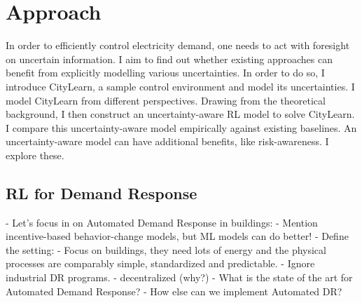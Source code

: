 \chapter{Approach}
    \label{approach}
    





In order to efficiently control electricity demand, one needs to act with foresight on uncertain information.
I aim to find out whether existing approaches can benefit from explicitly modelling various uncertainties.
In order to do so, I introduce CityLearn, a sample control environment and model its uncertainties. I model CityLearn from different perspectives.
Drawing from the theoretical background, I then construct an uncertainty-aware RL model to solve CityLearn.
I compare this uncertainty-aware model empirically against existing baselines.
An uncertainty-aware model can have additional benefits, like risk-awareness. I explore these. 


\section{RL for Demand Response}
- Let's focus in on Automated Demand Response in buildings:
    - Mention incentive-based behavior-change models, but ML models can do better!
    - Define the setting:
        - Focus on buildings, they need lots of energy and the physical processes are comparably simple, standardized and predictable.
        - Ignore industrial DR programs.
        - decentralized (why?)
- What is the state of the art for Automated Demand Response?
- How else can we implement Automated DR?


